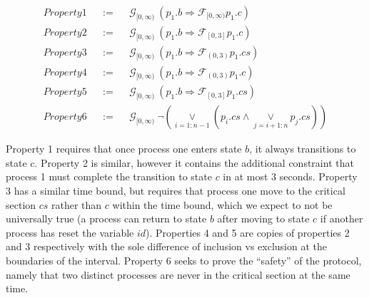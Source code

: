 \documentclass[a4paper,12pt]{article}
\begin{document}
\begin{align}
&Property 1 &&:=&& \mathcal{G}_{[0,\infty)}\ (p_1.b \Rightarrow \mathcal{F}_{[0,\infty)}p_1.c) &\nonumber \\
&Property 2 &&:=&& \mathcal{G}_{[0,\infty)}\ (p_1.b \Rightarrow \mathcal{F}_{[0,3]}p_1.c) &\nonumber \\
&Property 3 &&:=&& \mathcal{G}_{[0,\infty)}\ (p_1.b \Rightarrow \mathcal{F}_{(0,3)}p_1.cs) &\nonumber \\
&Property 4 &&:=&& \mathcal{G}_{[0,\infty)}\ (p_1.b \Rightarrow \mathcal{F}_{(0,3)}p_1.c) &\nonumber \\
&Property 5 &&:=&& \mathcal{G}_{[0,\infty)}\ (p_1.b \Rightarrow \mathcal{F}_{[0,3]}p_1.cs) &\nonumber \\
&Property 6 &&:=&& \mathcal{G}_{[0,\infty)}\ \neg (\underset{i=1:n-1}{\lor} (p_i.cs \land \underset{j=i+1:n}{\lor} p_j.cs ))  &\nonumber
\end{align}

Property 1 requires that once process one enters state \(b\), it always
transitions to state \(c\). Property 2 is similar, however it contains the
additional constraint that process 1 must complete the transition to state \(c\)
in at most 3 seconds. Property 3 has a similar time bound, but requires that
process one move to the critical section \(cs\) rather than \(c\) within the
time bound, which we expect to not be universally true (a process can return to
state \(b\) after moving to state \(c\) if another process has reset the
variable \(id\)). Properties 4 and 5 are copies of properties 2 and 3
respectively with the sole difference of inclusion vs exclusion at the
boundaries of the interval. Property 6 seeks to prove the ``safety'' of the
protocol, namely that two distinct processes are never in the critical section
at the same time.
\end{document}
